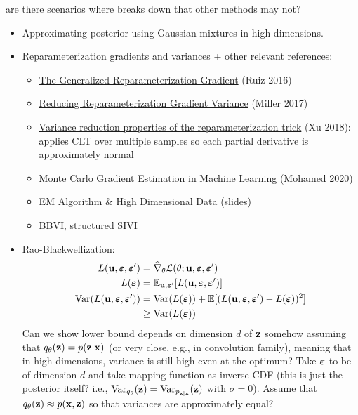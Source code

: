 \documentclass[10pt]{article}
\begin{document}
\todo are there scenarios where \uivi breaks down that other \vi methods may not?

\begin{itemize}

\item
Approximating posterior using Gaussian mixtures in high-dimensions.

\item
Reparameterization gradients and variances + other relevant references:
\begin{itemize}
\item
\href{https://arxiv.org/pdf/1610.02287.pdf}{The Generalized Reparameterization Gradient} (Ruiz 2016)
\item
\href{https://proceedings.neurips.cc/paper/2017/file/325995af77a0e8b06d1204a171010b3a-Paper.pdf}{Reducing Reparameterization Gradient Variance} (Miller 2017)
\item
\href{https://arxiv.org/pdf/1809.10330.pdf}{Variance reduction properties of the reparameterization trick} (Xu 2018): applies CLT over multiple samples so each partial derivative is approximately normal
\item
\href{https://jmlr.org/papers/volume21/19-346/19-346.pdf}{Monte Carlo Gradient Estimation in Machine Learning} (Mohamed 2020)
\item
\href{http://www.svcl.ucsd.edu/courses/ece175/handouts/slides11.pdf}{EM Algorithm \& High Dimensional Data} (slides)
\item
BBVI, structured SIVI
\end{itemize}

\item
Rao-Blackwellization:
\begin{align*}
L(\mathbf{u},\bm{\varepsilon},\bm{\varepsilon}') &= \widehat{\nabla}_\theta\mathcal{L}(\theta;\mathbf{u},\bm{\varepsilon},\bm{\varepsilon}') \\
L(\bm{\varepsilon}) &= \mathbb{E}_{\mathbf{u},\bm{\varepsilon}'}[L(\mathbf{u},\bm{\varepsilon},\bm{\varepsilon}')] \\
\mathrm{Var}(L(\mathbf{u},\bm{\varepsilon},\bm{\varepsilon}')) &= \mathrm{Var}(L(\bm{\varepsilon})) + \mathbb{E}[(L(\mathbf{u},\bm{\varepsilon},\bm{\varepsilon}')-L(\bm{\varepsilon}))^2] \\
& \geq \mathrm{Var}(L(\bm{\varepsilon}))
\end{align*}
\todo Can we show lower bound depends on dimension $d$ of $\mathbf{z}$ somehow assuming that $q_\theta(\mathbf{z})=p(\mathbf{z}|\mathbf{x})$ (or very close, e.g., in convolution family), meaning that in high dimensions, variance is still high even at the optimum? Take $\bm{\varepsilon}$ to be of dimension $d$ and take mapping function as inverse CDF (this is just the posterior itself? i.e., $\mathrm{Var}_{q_\theta}(\mathbf{z})=\mathrm{Var}_{p_{\mathbf{z}|\mathbf{x}}}(\mathbf{z})$ with $\sigma=0$). Assume that $q_\theta(\mathbf{z})\approx p(\mathbf{x},\mathbf{z})$ so that variances are approximately equal?


\end{itemize}
\end{document}

